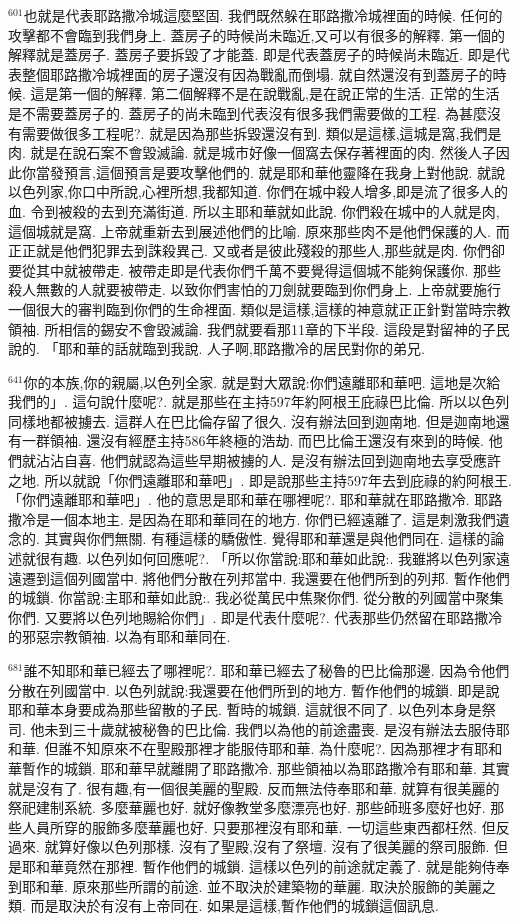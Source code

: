 \documentclass{book}
\begin{document}
$^{601}$也就是代表耶路撒冷城這麼堅固.
我們既然躲在耶路撒冷城裡面的時候.
任何的攻擊都不會臨到我們身上.
蓋房子的時候尚未臨近,又可以有很多的解釋.
第一個的解釋就是蓋房子.
蓋房子要拆毀了才能蓋.
即是代表蓋房子的時候尚未臨近.
即是代表整個耶路撒冷城裡面的房子還沒有因為戰亂而倒塌.
就自然還沒有到蓋房子的時候.
這是第一個的解釋.
第二個解釋不是在說戰亂,是在說正常的生活.
正常的生活是不需要蓋房子的.
蓋房子的尚未臨到代表沒有很多我們需要做的工程.
為甚麼沒有需要做很多工程呢?.
就是因為那些拆毀還沒有到.
類似是這樣,這城是窩,我們是肉.
就是在說石案不會毀滅論.
就是城市好像一個窩去保存著裡面的肉.
然後人子因此你當發預言,這個預言是要攻擊他們的.
就是耶和華他靈降在我身上對他說.
就說以色列家,你口中所說,心裡所想,我都知道.
你們在城中殺人增多,即是流了很多人的血.
令到被殺的去到充滿街道.
所以主耶和華就如此說.
你們殺在城中的人就是肉,這個城就是窩.
上帝就重新去到展述他們的比喻.
原來那些肉不是他們保護的人.
而正正就是他們犯罪去到誅殺異己.
又或者是彼此殘殺的那些人,那些就是肉.
你們卻要從其中就被帶走.
被帶走即是代表你們千萬不要覺得這個城不能夠保護你.
那些殺人無數的人就要被帶走.
以致你們害怕的刀劍就要臨到你們身上.
上帝就要施行一個很大的審判臨到你們的生命裡面.
類似是這樣,這樣的神意就正正針對當時宗教領袖.
所相信的錫安不會毀滅論.
我們就要看那11章的下半段.
這段是對留神的子民說的.
「耶和華的話就臨到我說.
人子啊,耶路撒冷的居民對你的弟兄.

$^{641}$你的本族,你的親屬,以色列全家.
就是對大眾說:你們遠離耶和華吧.
這地是次給我們的」.
這句說什麼呢?.
就是那些在主持597年約阿根王庇祿巴比倫.
所以以色列同樣地都被擄去.
這群人在巴比倫存留了很久.
沒有辦法回到迦南地.
但是迦南地還有一群領袖.
還沒有經歷主持586年終極的浩劫.
而巴比倫王還沒有來到的時候.
他們就沾沾自喜.
他們就認為這些早期被擄的人.
是沒有辦法回到迦南地去享受應許之地.
所以就說「你們遠離耶和華吧」.
即是說那些主持597年去到庇祿的約阿根王.
「你們遠離耶和華吧」.
他的意思是耶和華在哪裡呢?.
耶和華就在耶路撒冷.
耶路撒冷是一個本地主.
是因為在耶和華同在的地方.
你們已經遠離了.
這是刺激我們遺念的.
其實與你們無關.
有種這樣的驕傲性.
覺得耶和華還是與他們同在.
這樣的論述就很有趣.
以色列如何回應呢?.
「所以你當說:耶和華如此說:.
我雖將以色列家遠遠遷到這個列國當中.
將他們分散在列邦當中.
我還要在他們所到的列邦.
暫作他們的城鎖.
你當說:主耶和華如此說:.
我必從萬民中焦聚你們.
從分散的列國當中聚集你們.
又要將以色列地賜給你們」.
即是代表什麼呢?.
代表那些仍然留在耶路撒冷的邪惡宗教領袖.
以為有耶和華同在.

$^{681}$誰不知耶和華已經去了哪裡呢?.
耶和華已經去了秘魯的巴比倫那邊.
因為令他們分散在列國當中.
以色列就說:我還要在他們所到的地方.
暫作他們的城鎖.
即是說耶和華本身要成為那些留散的子民.
暫時的城鎖.
這就很不同了.
以色列本身是祭司.
他未到三十歲就被秘魯的巴比倫.
我們以為他的前途盡喪.
是沒有辦法去服侍耶和華.
但誰不知原來不在聖殿那裡才能服侍耶和華.
為什麼呢?.
因為那裡才有耶和華暫作的城鎖.
耶和華早就離開了耶路撒冷.
那些領袖以為耶路撒冷有耶和華.
其實就是沒有了.
很有趣,有一個很美麗的聖殿.
反而無法侍奉耶和華.
就算有很美麗的祭祀建制系統.
多麼華麗也好.
就好像教堂多麼漂亮也好.
那些師班多麼好也好.
那些人員所穿的服飾多麼華麗也好.
只要那裡沒有耶和華.
一切這些東西都枉然.
但反過來.
就算好像以色列那樣.
沒有了聖殿,沒有了祭壇.
沒有了很美麗的祭司服飾.
但是耶和華竟然在那裡.
暫作他們的城鎖.
這樣以色列的前途就定義了.
就是能夠侍奉到耶和華.
原來那些所謂的前途.
並不取決於建築物的華麗.
取決於服飾的美麗之類.
而是取決於有沒有上帝同在.
如果是這樣,暫作他們的城鎖這個訊息.
\end{document}
